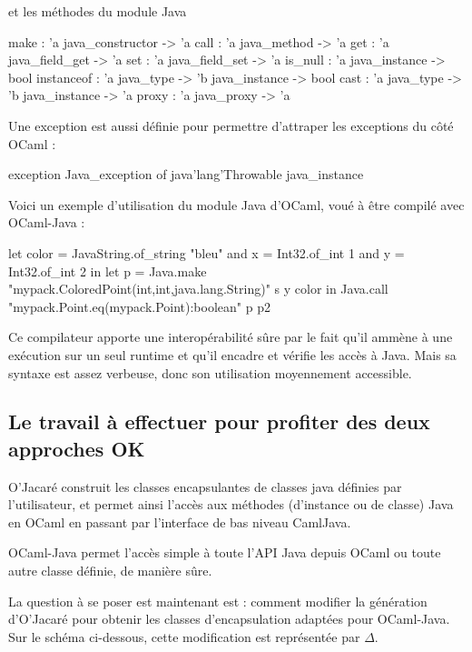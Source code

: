 \documentclass[a4paper, 11pt]{article}
\begin{document}
\noindent
et les méthodes du module Java

\begin{OCamlEx}
make : 'a java_constructor -> 'a 
call : 'a java_method -> 'a 
get : 'a java_field_get -> 'a 
set : 'a java_field_set -> 'a 
is_null : 'a java_instance -> bool 
instanceof : 'a java_type -> 'b java_instance -> bool
cast : 'a java_type -> 'b java_instance -> 'a
proxy : 'a java_proxy -> 'a
\end{OCamlEx}
Une exception est aussi définie pour permettre d'attraper les
exceptions du côté OCaml :
\begin{OCamlEx}
exception Java_exception of java'lang'Throwable java_instance
\end{OCamlEx}
\newpage
Voici un exemple d'utilisation du module Java d'OCaml, voué à être compilé avec OCaml-Java :
\begin{OCamlEx}
let color = JavaString.of_string "bleu"
and x = Int32.of_int 1
and y = Int32.of_int 2 in
let p = Java.make "mypack.ColoredPoint(int,int,java.lang.String)" s y color 
in
   Java.call "mypack.Point.eq(mypack.Point):boolean" p p2
\end{OCamlEx}

Ce compilateur apporte une interopérabilité sûre par le fait qu'il ammène à une exécution sur un seul runtime et qu'il encadre et vérifie les accès à Java.
Mais sa syntaxe est assez verbeuse, donc son utilisation moyennement accessible. 







\subsection{Le travail à effectuer pour profiter des deux approches OK}
O'Jacaré construit les classes encapsulantes de classes
java définies par l'utilisateur, et permet ainsi l'accès aux méthodes
(d'instance ou de classe) Java en OCaml en passant par l'interface de bas niveau CamlJava.

OCaml-Java permet l'accès simple à toute l'API Java depuis OCaml ou toute autre classe définie, de manière sûre. 

La question à se poser est maintenant est : comment modifier la génération d’O’Jacaré pour obtenir les classes d’encapsulation adaptées pour OCaml-Java. Sur le schéma ci-dessous, cette modification est représentée par $\Delta$.
\end{document}
